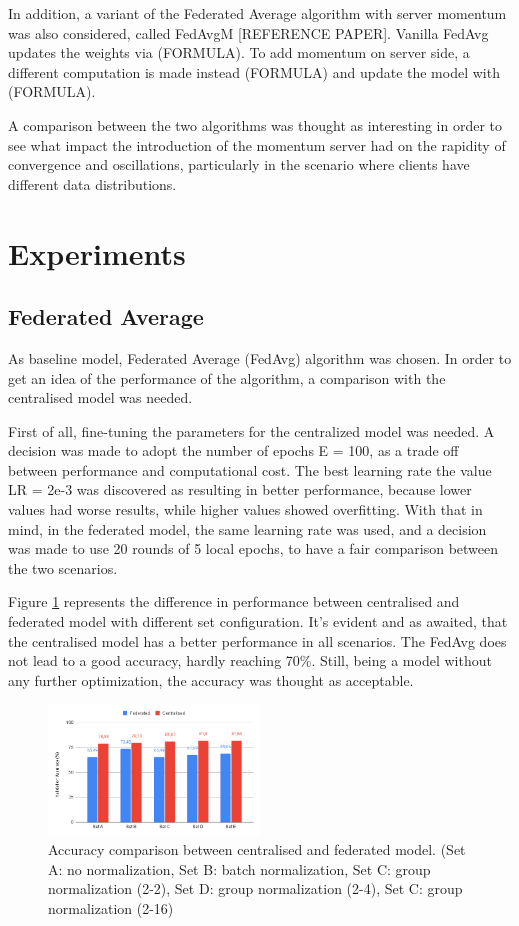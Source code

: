 \documentclass[twocolumn]{article}
\begin{document}
In addition, a variant of the Federated Average algorithm with server momentum was also considered, called FedAvgM [REFERENCE PAPER]. Vanilla FedAvg updates the weights via (FORMULA). To add momentum on server side, a different computation is made instead (FORMULA) and update the model with (FORMULA). 

A comparison between the two algorithms was thought as interesting in order to see what impact the introduction of the momentum server had on the rapidity of convergence and oscillations, particularly in the scenario where clients have different data distributions.


\section{Experiments} %
\subsection{Federated Average}
As baseline model, Federated Average (FedAvg) algorithm was chosen. In order to get an idea of the performance of the algorithm, a comparison with the centralised model was needed. 

First of all, fine-tuning the parameters for the centralized model was needed. A decision was made to adopt the number of epochs E = 100, as a trade off between performance and computational cost. The best learning rate the value LR = 2e-3 was discovered as resulting in better performance, because lower values had worse results, while higher values showed overfitting. With that in mind, in the federated model, the same learning rate was used, and a decision was made to use 20 rounds of 5 local epochs, to have a fair comparison between the two scenarios.

Figure \ref{AccCompFedCent} represents the difference in performance between centralised and federated model with different set configuration. It's evident and as awaited, that the centralised model has a better performance in all scenarios. The FedAvg does not lead to a good accuracy, hardly reaching 70\%. Still, being a model without any further optimization, the accuracy was thought as acceptable.


\begin{figure}
    \centering
    \includegraphics[width=0.5\textwidth,height=.3\textheight]{FedAccuracyComp.png}
    \caption{Accuracy comparison between centralised and federated model. (Set A: no normalization, Set B: batch normalization, Set C: group normalization (2-2), Set D: group normalization (2-4), Set C: group normalization (2-16)}
     \label{AccCompFedCent} 
\end{figure}
\end{document}
